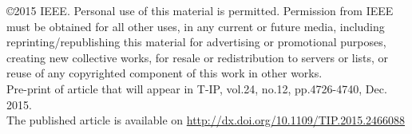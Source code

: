 \documentclass[journal,onecolumn,12pt]{IEEEtran}
\begin{document}
\noindent \copyright 2015 IEEE. Personal use of this material is permitted. Permission from IEEE must be obtained for all other uses, in any current or future media, including reprinting/republishing this material for advertising or promotional purposes, creating new collective works, for resale or redistribution to servers or lists, or reuse of any copyrighted component of this work in other works.
\\

\noindent Pre-print of article that will appear in T-IP, vol.24, no.12, pp.4726-4740, Dec. 2015.
\\

\noindent The published article is available on \url{http://dx.doi.org/10.1109/TIP.2015.2466088}


\end{document}
